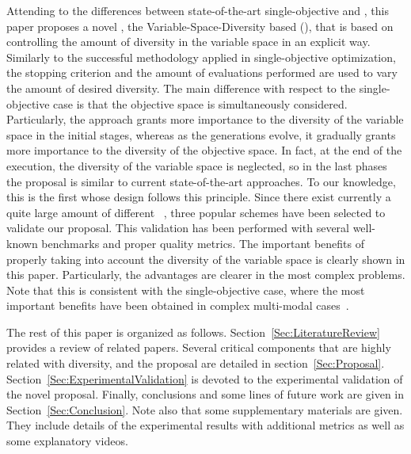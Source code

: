 Attending to the differences between state-of-the-art single-objective \EAS{} and \MOEAS{}, 
this paper proposes a novel \MOEA{}, the Variable-Space-Diversity based \MOEA{} (\VSDMOEA{}), 
that is based on controlling the amount of diversity in the variable space in an explicit way.
%
Similarly to the successful methodology applied in single-objective optimization, the stopping criterion and the 
amount of evaluations performed are used to vary the amount of desired diversity.
%
The main difference with respect to the single-objective case is that the objective space is simultaneously considered.
%
Particularly, the approach grants more importance to the diversity of the variable space in the initial stages, whereas 
as the generations evolve, it gradually grants more importance to the diversity of the objective space.
%
In fact, at the end of the execution, the diversity of the variable space is neglected, so in the last phases the proposal is similar to current state-of-the-art approaches.
%
To our knowledge, this is the first \MOEA{} whose design follows this principle.
%
Since there exist currently a quite large amount of different \MOEAS{}~\cite{Joel:MOEA_APPLICATIONS_BOOK_KCTAN}, 
three popular schemes have been selected to validate our proposal.
%
%
%
%
%
This validation has been performed with several well-known benchmarks and proper quality metrics.
%
The important benefits of properly taking into account the diversity of the variable space is
clearly shown in this paper.
%
Particularly, the advantages are clearer in the most complex problems.
%
Note that this is consistent with the single-objective case, where the most important benefits have been obtained
in complex multi-modal cases~\cite{Segura:17}.

The rest of this paper is organized as follows. 
%
Section~\ref{Sec:LiteratureReview} provides a review of related papers.
%
Several critical components that are highly related with diversity, and the \VSDMOEA{} proposal are detailed in section~\ref{Sec:Proposal}.
%
Section~\ref{Sec:ExperimentalValidation} is devoted to the experimental validation of the novel proposal.
%
Finally, conclusions and some lines of future work are given in Section~\ref{Sec:Conclusion}.
%
Note also that some supplementary materials are given.
%
They include details of the experimental results with additional metrics as well as some
explanatory videos.
